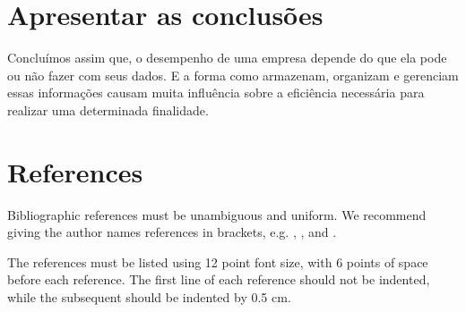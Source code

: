 \documentclass[12pt]{article}
\begin{document}
\section{Apresentar as conclusões}
	Concluímos assim que, o desempenho de uma empresa depende do que ela pode ou não fazer com seus dados. E a forma como armazenam, organizam e gerenciam essas informações causam muita influência sobre a eficiência necessária para realizar uma determinada finalidade.

\section{References}

Bibliographic references must be unambiguous and uniform.  We recommend giving
the author names references in brackets, e.g. \cite{knuth:84},
\cite{boulic:91}, and \cite{smith:99}.

The references must be listed using 12 point font size, with 6 points of space
before each reference. The first line of each reference should not be
indented, while the subsequent should be indented by 0.5 cm.



\end{document}

